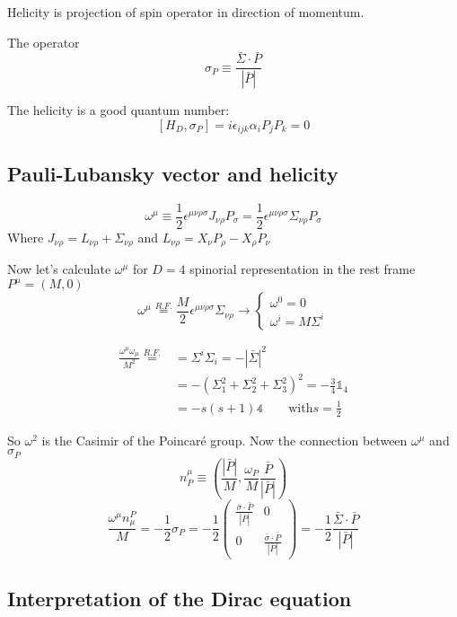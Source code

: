 Helicity is projection of spin operator in direction of momentum.

\begin{definition}
The   operator
\[ \sigma_P \equiv \frac{\bar{\Sigma}\cdot \bar{P}}{|\bar{P}|} \]
\end{definition}
The helicity is a good quantum number:
\[ [H_D, \sigma_P] = i \epsilon_{ijk}\alpha_iP_jP_k = 0 \]

\subsection{Pauli-Lubansky vector and helicity}
\[ \omega^\mu \equiv \frac{1}{2}\epsilon^{\mu\nu\rho\sigma}J_{\nu\rho}P_\sigma = \frac{1}{2}\epsilon^{\mu\nu\rho\sigma}\Sigma_{\nu\rho}P_\sigma \]
Where $J_{\nu\rho} = L_{\nu\rho} + \Sigma_{\nu\rho}$ and $L_{\nu\rho} = X_\nu P_\rho - X_\rho P_\nu$

Now let's calculate $\omega^\mu$ for $D=4$ spinorial representation in the rest frame $P^\mu = (M,0)$
\[ \omega^\mu \overset{R.F.}{=} \frac{M}{2}\epsilon^{\mu\nu\rho\sigma} \Sigma_{\nu\rho} \rightarrow \begin{cases}
\omega^0 = 0 \\ \omega^i = M\Sigma^i
\end{cases} \]

\begin{align*}
\frac{\omega^\mu \omega_\mu}{M^2}  \overset{R.F.}{=} &= \Sigma^i\Sigma_i = - |\bar{\Sigma}|^2 \\
&= - \left(\Sigma_1^2 + \Sigma_2^2 + \Sigma_3^2\right)^2 = - \frac{3}{4}\mathbb{1}_4 \\
&= -s(s+1)\mathbb{4} \qquad \text{with} s = \tfrac{1}{2}
\end{align*}

So $\omega^2$ is the Casimir of the Poincaré group.
Now the connection between $\omega^\mu$ and $\sigma_P$
\[ n^\mu_P \equiv \left(\frac{|\bar{P}|}{M}, \frac{\omega_P}{M}\frac{\bar{P}}{|\bar{P}|}\right) \]
\[ \frac{\omega^\mu n^P_\mu}{M} = - \frac{1}{2}\sigma_P = - \frac{1}{2} \begin{pmatrix}
\frac{\bar{\sigma}\cdot \bar{P}}{|\bar{P}|} & 0 \\ 0 & \frac{\bar{\sigma}\cdot \bar{P}}{|\bar{P}|}
\end{pmatrix}  = - \frac{1}{2}\frac{\bar{\Sigma}\cdot \bar{P}}{|\bar{P}|}\]


\subsection{Interpretation of the Dirac equation}
